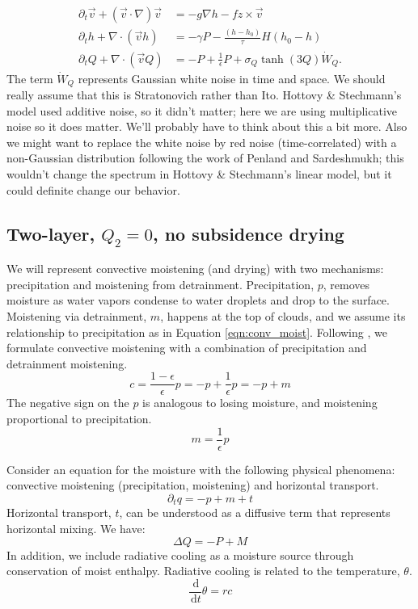 \documentclass[10pt]{article}
\newcommand{\rmd}{\,\mathrm{d}}
\begin{document}
\begin{align}
\partial_t \vec{v} + \left( \vec{v}\cdot \nabla \right)\vec{v} &= -g\nabla h - f\hat{z}\times \vec{v}\\
\partial_t h + \nabla \cdot \left(\vec{v}h\right) &= -\gamma P -\frac{(h-h_0)}{\tau}H(h_0-h)\\
\partial_t Q + \nabla \cdot \left(\vec{v}Q\right) &= -P + \frac{1}{\epsilon}P + \sigma_Q \tanh(3Q)\dot{W}_Q.
\end{align}
The term $\dot{W}_Q$ represents Gaussian white noise in time and space. 
We should really assume that this is Stratonovich rather than Ito.
Hottovy \& Stechmann's model used additive noise, so it didn't matter; here we are using multiplicative noise so it does matter.
We'll probably have to think about this a bit more.
Also we might want to replace the white noise by red noise (time-correlated) with a non-Gaussian distribution following the work of Penland and Sardeshmukh; this wouldn't change the spectrum in Hottovy \& Stechmann's linear model, but it could definite change our behavior.

\subsection{Two-layer, $Q_2 = 0$, no subsidence drying}


We will represent convective moistening (and drying) with two mechanisms: precipitation and moistening from detrainment.
Precipitation, $p$, removes moisture as water vapors condense to water droplets and drop to the surface.
Moistening via detrainment, $m$, happens at the top of clouds, and we assume its relationship to precipitation as in Equation \ref{eqn:conv_moist}.
Following \citet{CM2013}, we formulate convective moistening with a combination of precipitation and detrainment moistening.
\begin{equation}
c = \frac{1-\epsilon}{\epsilon} p = -p + \frac{1}{\epsilon}p = -p + m
\label{eqn:conv_moist}
\end{equation}
The negative sign on the $p$ is analogous to losing moisture, and moistening proportional to precipitation.
\begin{equation}
m = \frac{1}{\epsilon} p
\end{equation}

Consider an equation for the moisture with the following physical phenomena: convective moistening (precipitation, moistening) and horizontal transport.
\begin{equation}
\partial_t q = -p + m + t
\end{equation}
Horizontal transport, $t$, can be understood as a diffusive term that represents horizontal mixing.
{\color{blue} We have:
\begin{equation}
\Delta Q = -P + M
\label{neweq}
\end{equation} 
}
In addition, we include radiative cooling as a moisture source through conservation of moist enthalpy.  
Radiative cooling is related to the temperature, $\theta$.
\begin{equation}
\frac{\rmd}{\rmd t}\theta = rc
\end{equation}
\end{document}

